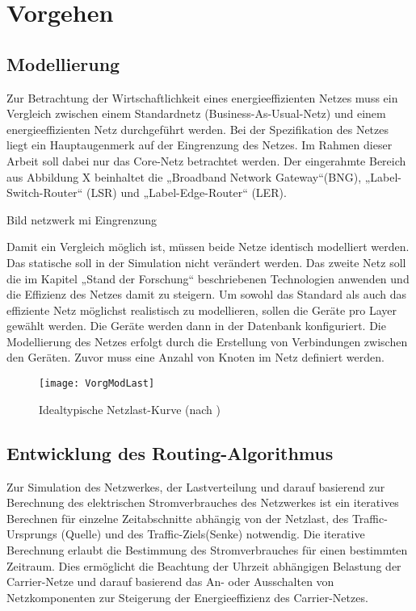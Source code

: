 \section{Vorgehen}

\subsection{Modellierung}
Zur Betrachtung der Wirtschaftlichkeit eines energieeffizienten Netzes muss ein Vergleich zwischen einem Standardnetz (Business-As-Usual-Netz) und einem energieeffizienten Netz durchgeführt werden. Bei der Spezifikation des Netzes liegt ein Hauptaugenmerk auf der Eingrenzung des Netzes. Im Rahmen dieser Arbeit soll dabei nur das Core-Netz betrachtet werden. Der eingerahmte Bereich aus Abbildung X beinhaltet die „Broadband Network Gateway“(BNG), „Label-Switch-Router“ (LSR) und „Label-Edge-Router“ (LER).


Bild netzwerk mi Eingrenzung








Damit ein Vergleich möglich ist, müssen beide Netze identisch modelliert werden. Das statische soll in der Simulation nicht  verändert werden. Das zweite Netz soll die im Kapitel „Stand der Forschung“ beschriebenen Technologien anwenden und die Effizienz des Netzes damit zu steigern. Um sowohl das Standard als auch das effiziente Netz möglichst realistisch zu modellieren, sollen die Geräte pro Layer gewählt werden. Die Geräte werden dann in der Datenbank konfiguriert. Die Modellierung des Netzes erfolgt durch die Erstellung von Verbindungen zwischen den Geräten. Zuvor muss eine Anzahl von Knoten im Netz definiert werden. 
\begin{figure}[!ht]
	\centering
	\texttt{[image: VorgModLast]}
	\caption{Idealtypische Netzlast-Kurve (nach \cite[3]{Chiaraviglio2009})} 
	\label{fig:VorgModLast}
\end{figure}


\subsection{Entwicklung des Routing-Algorithmus}\label{subsec:MethAlg}
Zur Simulation des Netzwerkes, der Lastverteilung und darauf basierend zur Berechnung des elektrischen Stromverbrauches des Netzwerkes ist ein iteratives Berechnen für einzelne Zeitabschnitte abhängig von der Netzlast, des Traffic-Ursprungs (Quelle) und des Traffic-Ziels(Senke) notwendig.
Die iterative Berechnung erlaubt die Bestimmung des Stromverbrauches für einen bestimmten Zeitraum. Dies ermöglicht die Beachtung der Uhrzeit abhängigen Belastung der Carrier-Netze und darauf basierend das An- oder Ausschalten von Netzkomponenten zur Steigerung der Energieeffizienz des Carrier-Netzes.  


